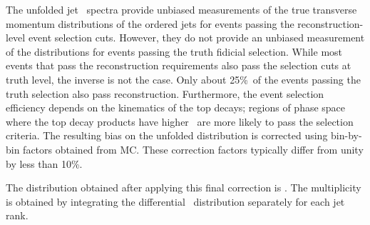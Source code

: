 The unfolded jet \pT\ spectra provide unbiased measurements of the true transverse momentum distributions of the ordered
jets for events passing the reconstruction-level event selection cuts.   However, they do 
not provide an unbiased measurement of the distributions for events passing the truth fidicial selection.
While most events that pass the reconstruction requirements
also pass the selection cuts at truth level, the inverse is not the case. Only about 25\%\ of the events
passing the truth selection also pass reconstruction.  Furthermore, the event selection efficiency
depends on the kinematics of the top decays;  regions of phase space where the top decay
products have higher \pT\ are more likely to pass the selection criteria.  The resulting bias on
the unfolded distribution is corrected  using bin-by-bin  factors obtained from MC.  
These correction factors typically differ from unity by less than 10\%.


The distribution obtained
after applying this final correction is \sigmapti.  The multiplicity
is obtained by integrating the differential \pT\ distribution separately for each jet rank.



